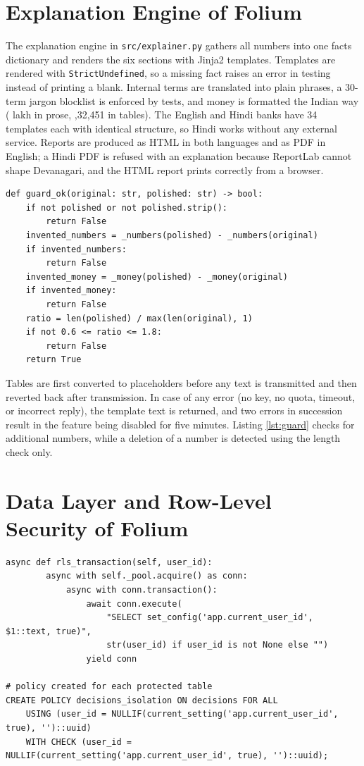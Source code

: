 \section{Explanation Engine of Folium}
The explanation engine in \texttt{src/explainer.py} gathers all numbers into one facts dictionary and renders the six sections with Jinja2 templates. Templates are rendered with \texttt{StrictUndefined}, so a missing fact raises an error in testing instead of printing a blank. Internal terms are translated into plain phrases, a 30-term jargon blocklist is enforced by tests, and money is formatted the Indian way ( lakh in prose, ,32,451 in tables). The English and Hindi banks have 34 templates each with identical structure, so Hindi works without any external service. Reports are produced as HTML in both languages and as PDF in English; a Hindi PDF is refused with an explanation because ReportLab cannot shape Devanagari, and the HTML report prints correctly from a browser.

\begin{lstlisting}[caption={Number-preservation check for optional AI wording (\texttt{src/llm\_polish.py})}, label=lst:guard]
def guard_ok(original: str, polished: str) -> bool:
    if not polished or not polished.strip():
        return False
    invented_numbers = _numbers(polished) - _numbers(original)
    if invented_numbers:
        return False
    invented_money = _money(polished) - _money(original)
    if invented_money:
        return False
    ratio = len(polished) / max(len(original), 1)
    if not 0.6 <= ratio <= 1.8:
        return False
    return True
\end{lstlisting}

Tables are first converted to placeholders before any text is transmitted and then reverted back after transmission. In case of any error (no key, no quota, timeout, or incorrect reply), the template text is returned, and two errors in succession result in the feature being disabled for five minutes. Listing \ref{lst:guard} checks for additional numbers, while a deletion of a number is detected using the length check only.

\section{Data Layer and Row-Level Security of Folium}
\begin{lstlisting}[caption={Per-transaction user for row-level security (\texttt{backend/db/pool.py} and migration 0007)}, label=lst:rls]
    async def rls_transaction(self, user_id):
        async with self._pool.acquire() as conn:
            async with conn.transaction():
                await conn.execute(
                    "SELECT set_config('app.current_user_id', $1::text, true)",
                    str(user_id) if user_id is not None else "")
                yield conn

# policy created for each protected table
CREATE POLICY decisions_isolation ON decisions FOR ALL
    USING (user_id = NULLIF(current_setting('app.current_user_id', true), '')::uuid)
    WITH CHECK (user_id = NULLIF(current_setting('app.current_user_id', true), '')::uuid);
\end{lstlisting}


